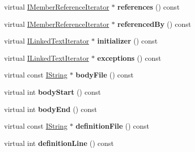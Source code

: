 \begin{DoxyCompactItemize}
\item 
\mbox{\label{class_member_handler_a83220d2fd4f8a3c3e4de44f01baac449}} 
virtual \mbox{\hyperlink{class_i_member_reference_iterator}{I\+Member\+Reference\+Iterator}} $\ast$ {\bfseries references} () const
\item 
\mbox{\label{class_member_handler_a77b1967961af74fa18b3343e2402062d}} 
virtual \mbox{\hyperlink{class_i_member_reference_iterator}{I\+Member\+Reference\+Iterator}} $\ast$ {\bfseries referenced\+By} () const
\item 
\mbox{\label{class_member_handler_ae2ea52e4a87863e5ee73bb2cb4d348cb}} 
virtual \mbox{\hyperlink{class_i_linked_text_iterator}{I\+Linked\+Text\+Iterator}} $\ast$ {\bfseries initializer} () const
\item 
\mbox{\label{class_member_handler_aed5f1bf303787c17110160c58fb6d91f}} 
virtual \mbox{\hyperlink{class_i_linked_text_iterator}{I\+Linked\+Text\+Iterator}} $\ast$ {\bfseries exceptions} () const
\item 
\mbox{\label{class_member_handler_a6c3321dd1839cb6d8db97cb4951bca9d}} 
virtual const \mbox{\hyperlink{class_i_string}{I\+String}} $\ast$ {\bfseries body\+File} () const
\item 
\mbox{\label{class_member_handler_afb86b2e1904133c9eacd7ab8e6b5ca94}} 
virtual int {\bfseries body\+Start} () const
\item 
\mbox{\label{class_member_handler_aa76083321428cc1e0eb95a3901deb1d8}} 
virtual int {\bfseries body\+End} () const
\item 
\mbox{\label{class_member_handler_ae1a1b91c610698eeefeef009427057f0}} 
virtual const \mbox{\hyperlink{class_i_string}{I\+String}} $\ast$ {\bfseries definition\+File} () const
\item 
\mbox{\label{class_member_handler_a3f8e6b3e34b47a2b2d31ef22f26bd587}} 
virtual int {\bfseries definition\+Line} () const
\item 
\mbox{\label{class_member_handler_a81abeff85bd5bd2b7e6a6ed3f363b75d}} 

\end{DoxyCompactItemize}
